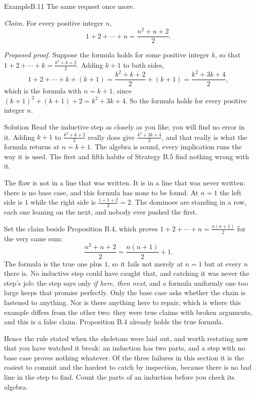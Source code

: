 \documentclass[a4paper,12pt,oneside]{memoir}
\begin{document}
\begin{workedexample}
\begin{envexample}{Example}{B.11}{}
The same request once more.

\emph{Claim.} For every positive integer \(n\), \[ 1 + 2 + \cdots + n = \frac{n^{2} + n + 2}{2}. \]

\emph{Proposed proof.} Suppose the formula holds for some positive integer \(k\), so that \(1 + 2 + \cdots + k = \frac{k^{2} + k + 2}{2}\). Adding \(k + 1\) to both sides, \[ 1 + 2 + \cdots + k + (k + 1) = \frac{k^{2} + k + 2}{2} + (k + 1) = \frac{k^{2} + 3k + 4}{2}, \] which is the formula with \(n = k + 1\), since \((k + 1)^{2} + (k + 1) + 2 = k^{2} + 3k + 4\). So the formula holds for every positive integer \(n\).
\end{envexample}
\begin{envsolution}{Solution}{}{}
Read the inductive step as closely as you like; you will find no error in it. Adding \(k + 1\) to \(\frac{k^{2} + k + 2}{2}\) really does give \(\frac{k^{2} + 3k + 4}{2}\), and that really is what the formula returns at \(n = k + 1\). The algebra is sound, every implication runs the way it is used. The first and fifth habits of Strategy B.5 find nothing wrong with it.

The flaw is not in a line that was written. It is in a line that was never written: there is no base case, and this formula has none to be found. At \(n = 1\) the left side is \(1\) while the right side is \(\frac{1 + 1 + 2}{2} = 2\). The dominoes are standing in a row, each one leaning on the next, and nobody ever pushed the first.

Set the claim beside Proposition B.4, which proves \(1 + 2 + \cdots + n = \frac{n(n + 1)}{2}\) for the very same sum: \[ \frac{n^{2} + n + 2}{2} = \frac{n(n + 1)}{2} + 1. \] The formula is the true one plus \(1\), so it fails not merely at \(n = 1\) but at every \(n\) there is. No inductive step could have caught that, and catching it was never the step’s job: the step says only \emph{if here, then next}, and a formula uniformly one too large keeps that promise perfectly. Only the base case asks whether the chain is fastened to anything. Nor is there anything here to repair, which is where this example differs from the other two: they were true claims with broken arguments, and this is a false claim. Proposition B.4 already holds the true formula.

Hence the rule stated when the skeletons were laid out, and worth restating now that you have watched it break: an induction has two parts, and a step with no base case proves nothing whatever. Of the three failures in this section it is the easiest to commit and the hardest to catch by inspection, because there is no bad line in the step to find. Count the parts of an induction before you check its algebra.
\end{envsolution}
\end{workedexample}
\end{document}
